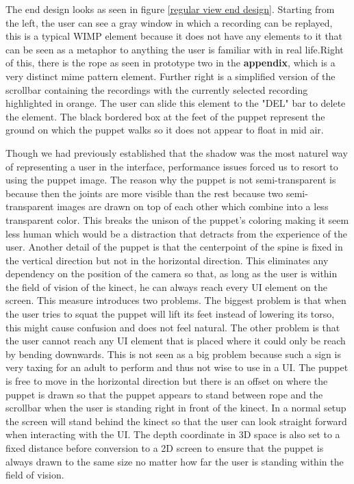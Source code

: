 The end design looks as seen in figure \ref{regular view end design}. Starting from the left, the user can see a gray window in which a recording can be replayed, this is a typical WIMP element because it does not have any elements to it that can be seen as a metaphor to anything the user is familiar with in real life.Right of this, there is the rope as seen in prototype two in the \textbf{ appendix}, which is a very distinct mime pattern element. Further right is a simplified version of the scrollbar containing the recordings with the currently selected recording highlighted in orange. The user can slide this element to the "DEL" bar to delete the element. The black bordered box at the feet of the puppet represent the ground on which the puppet walks so it does not appear to float in mid air.

Though we had previously established that the shadow was the most naturel way of representing a user in the interface, performance issues forced us to resort to using the puppet image. The reason why the puppet is not semi-transparent is because then the joints are  more visible than the rest because two semi-transparent images are drawn on top of each other which combine into a less transparent color. This breaks the unison of the puppet's coloring making it seem less human which would be a distraction that detracts from the experience of the user. Another detail of the puppet is that the centerpoint of the spine is fixed in the vertical direction but not in the horizontal direction. This eliminates any dependency on the position of the camera so that, as long as the user is within the field of vision of the kinect, he can always reach every UI element on the screen. This measure introduces two  problems. The biggest problem is that when the user tries to squat the puppet will lift its feet instead of lowering its torso, this might cause confusion and does not feel natural. The other problem is that the user cannot reach any UI element that is placed where it could only be reach by bending downwards. This is not seen as a big problem because such a sign is very taxing for an adult to perform and thus not wise to use in a UI. The puppet is free to move in the horizontal direction but there is an offset on where the puppet is drawn so that the puppet appears to stand between rope and the scrollbar when the user is standing right in front of the kinect. In a normal setup the screen will stand behind the kinect so that the user can look straight forward when interacting with the UI. The depth coordinate in 3D space is also set to a fixed distance before conversion to a 2D screen to ensure that the puppet is always drawn to the same size no matter how far the user is standing within the field of vision.

